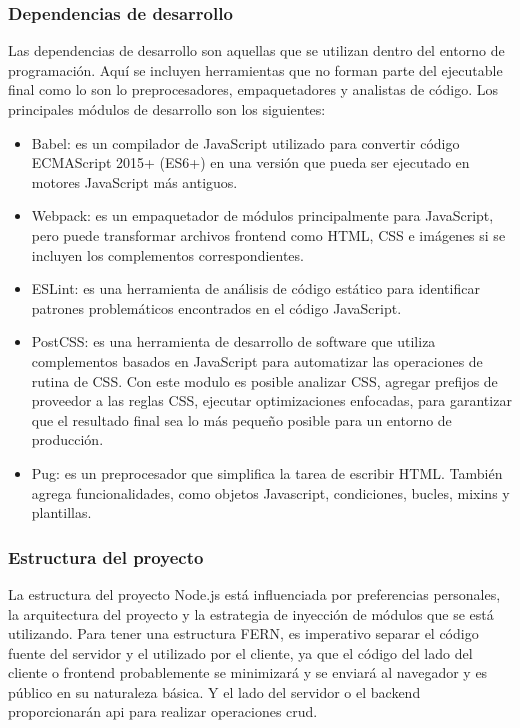 \subsubsection{Dependencias de desarrollo}
Las dependencias de desarrollo son aquellas que se utilizan dentro del entorno de programación. Aquí se incluyen herramientas que no forman parte del ejecutable final como lo son lo preprocesadores, empaquetadores y analistas de código. Los principales módulos de desarrollo son los siguientes:
\begin{itemize}
  \item Babel: es un compilador de JavaScript utilizado para convertir código ECMAScript 2015+ (ES6+) en una versión que pueda ser ejecutado en motores JavaScript más antiguos.
  \item Webpack: es un empaquetador de módulos principalmente para JavaScript, pero puede transformar archivos \gls{frontend} como HTML, CSS e imágenes si se incluyen los complementos correspondientes.
  \item ESLint: es una herramienta de análisis de código estático para identificar patrones problemáticos encontrados en el código JavaScript.
  \item PostCSS: es una herramienta de desarrollo de software que utiliza complementos basados en JavaScript para automatizar las operaciones de rutina de CSS. Con este modulo es posible analizar CSS, agregar prefijos de proveedor a las reglas CSS, ejecutar optimizaciones enfocadas, para garantizar que el resultado final sea lo más pequeño posible para un entorno de producción.
  \item Pug: es un preprocesador que simplifica la tarea de escribir HTML. También agrega funcionalidades, como objetos Javascript, condiciones, bucles, \glspl{mixin} y plantillas.
\end{itemize}

\subsubsection{Estructura del proyecto}
La estructura del proyecto Node.js está influenciada por preferencias personales, la arquitectura del proyecto y la estrategia de inyección de módulos que se está utilizando. Para tener una estructura FERN, es imperativo separar el código fuente del servidor y el utilizado por el cliente, ya que el código del lado del cliente o \gls{frontend} probablemente se minimizará y se enviará al navegador y es público en su naturaleza básica. Y el lado del servidor o el \gls{backend} proporcionarán \acrshort{api} para realizar operaciones \acrshort{crud}.

